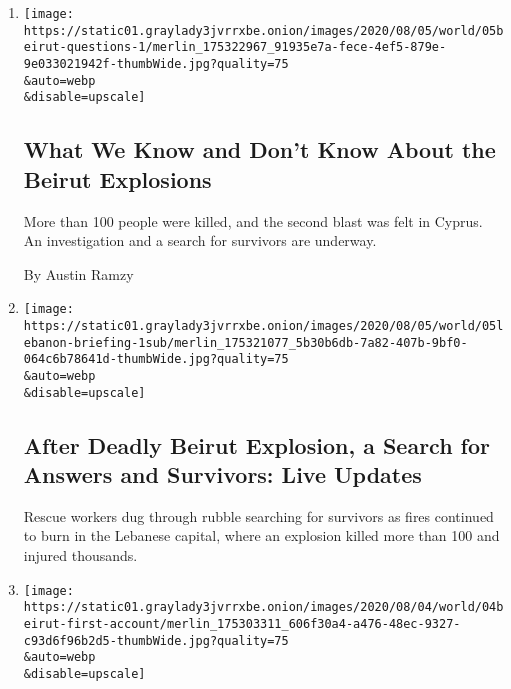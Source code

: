 \begin{enumerate}
\def\labelenumi{\arabic{enumi}.}
\item
  \href{/2020/08/05/world/middleeast/beirut-explosion-what-happened.html}{}

  \texttt{[image: https://static01.graylady3jvrrxbe.onion/images/2020/08/05/world/05beirut-questions-1/merlin\_175322967\_91935e7a-fece-4ef5-879e-9e033021942f-thumbWide.jpg?quality=75\\\&auto=webp\\\&disable=upscale]}

  \hypertarget{what-we-know-and-dont-know-about-the-beirut-explosions}{%
  \subsection{What We Know and Don't Know About the Beirut
  Explosions}\label{what-we-know-and-dont-know-about-the-beirut-explosions}}

  More than 100 people were killed, and the second blast was felt in
  Cyprus. An investigation and a search for survivors are underway.

  By Austin Ramzy
\item
  \href{/2020/08/05/world/middleeast/beirut-explosion.html}{}

  \texttt{[image: https://static01.graylady3jvrrxbe.onion/images/2020/08/05/world/05lebanon-briefing-1sub/merlin\_175321077\_5b30b6db-7a82-407b-9bf0-064c6b78641d-thumbWide.jpg?quality=75\\\&auto=webp\\\&disable=upscale]}

  \hypertarget{after-deadly-beirut-explosion-a-search-for-answers-and-survivors-live-updates}{%
  \subsection{After Deadly Beirut Explosion, a Search for Answers and
  Survivors: Live
  Updates}\label{after-deadly-beirut-explosion-a-search-for-answers-and-survivors-live-updates}}

  Rescue workers dug through rubble searching for survivors as fires
  continued to burn in the Lebanese capital, where an explosion killed
  more than 100 and injured thousands.
\item
  \href{/2020/08/04/world/middleeast/lebanon-explosion-beirut.html}{}

  \texttt{[image: https://static01.graylady3jvrrxbe.onion/images/2020/08/04/world/04beirut-first-account/merlin\_175303311\_606f30a4-a476-48ec-9327-c93d6f96b2d5-thumbWide.jpg?quality=75\\\&auto=webp\\\&disable=upscale]}

  \hypertarget{i-was-bloodied-and-dazed-beirut-strangers-treated-me-like-a-friend}{%
}
\end{enumerate}

